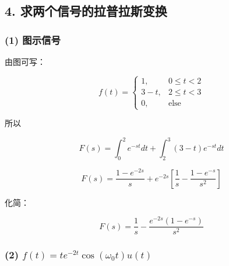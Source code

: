 \documentclass[11pt]{ctexart}
\begin{document}
\subsection*{4. 求两个信号的拉普拉斯变换}



\subsubsection*{(1) 图示信号}



由图可写：\par



\[

f(t)=

\begin{cases}

1, & 0\le t<2\\

3-t, & 2\le t<3\\

0, & \text{else}

\end{cases}

\]



所以\par



\[

F(s)=\int_0^2e^{-st}dt+\int_2^3(3-t)e^{-st}dt

\]



\[

F(s)=\frac{1-e^{-2s}}{s}

+e^{-2s}

\left[

\frac{1}{s}-\frac{1-e^{-s}}{s^2}

\right]

\]



化简：\par



\[

F(s)=\frac{1}{s}

-\frac{e^{-2s}(1-e^{-s})}{s^2}

\]



\subsubsection*{(2) \(f(t)=te^{-2t}\cos(\omega_0t)u(t)\)}
\end{document}
